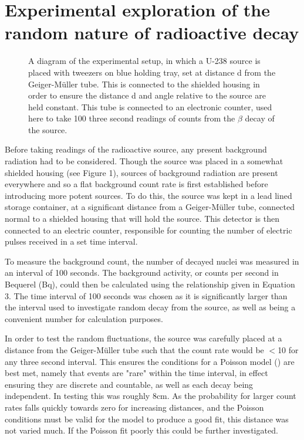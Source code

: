 \documentclass[11pt]{article}
\begin{document}
    \section{Experimental exploration of the random nature of radioactive decay}
\begin{figure}[h]
        \begin{center}
            \def\svgwidth{\columnwidth}
            
             \caption{A diagram of the experimental setup, in which a U-238 source is placed with tweezers on blue holding tray, set at distance d from the Geiger-Müller tube. This is connected to the shielded housing in order to ensure the distance d and angle relative to the source are held constant. This tube is connected to an electronic counter, used here to take  100 three second readings of counts from the $\beta$ decay of the source.}
             \label{fig:experimental setup}
             \vspace{-1.5em}
        \end{center}
    \end{figure}
\noindent Before taking readings of the radioactive source, any present background radiation had to be considered. Though the source was placed in a somewhat shielded housing (see Figure 1), sources of background radiation are present everywhere and so a flat background count rate is first established before introducing more potent sources. To do this, the source was kept in a lead lined storage container, at a significant distance from a Geiger-Müller tube, connected normal to a shielded housing that will hold the source. This detector is then connected to an electric counter, responsible for counting the number of electric pulses received in a set time interval.

\noindent To measure the background count, the number of decayed nuclei was measured in an interval of 100 seconds. The background activity, or counts per second in Bequerel (Bq), could then be calculated using the relationship given in Equation 3. The time interval of 100 seconds was chosen as it is significantly larger than the interval used to investigate random decay from the source, as well as being a convenient number for calculation purposes.

\noindent In order to test the random fluctuations, the  source was carefully placed at a distance from the Geiger-Müller tube such that the count rate would be $<$10 for any three second interval. This ensures the conditions for a Poisson model (\cite{thompson2001poisson}) are best met, namely that events are "rare" within the time interval, in effect ensuring they are discrete and countable, as well as each decay being independent. In testing this was roughly 8cm. As the probability for larger count rates falls quickly towards zero for increasing distances, and the Poisson conditions must be valid for the model to produce a good fit, this distance was not varied much. If the Poisson fit poorly this could be further investigated.
\end{document}
